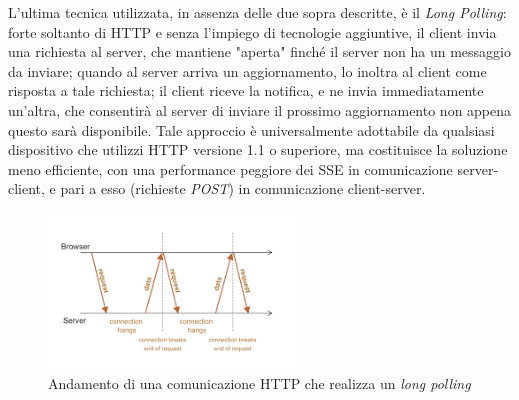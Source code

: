 L'ultima tecnica utilizzata, in assenza delle due sopra descritte, è il \emph{Long Polling}: forte soltanto di HTTP e senza l'impiego di tecnologie aggiuntive, il client invia una richiesta al server, che mantiene "aperta" finché il server non ha un messaggio da inviare; quando al server arriva un aggiornamento, lo inoltra al client come risposta a tale richiesta; il client riceve la notifica, e ne invia immediatamente un'altra, che consentirà al server di inviare il prossimo aggiornamento non appena questo sarà disponibile. Tale approccio è universalmente adottabile da qualsiasi dispositivo che utilizzi HTTP versione 1.1 o superiore, ma costituisce la soluzione meno efficiente, con una performance peggiore dei SSE in comunicazione server-client, e pari a esso (richieste \emph{POST}) in comunicazione client-server.
\begin{figure}[H]
    \centering
    \includegraphics[width=0.6\textwidth]{fig/long_polling.png}
    \caption[Diagramma Long Polling]{Andamento di una comunicazione HTTP che realizza un \emph{long polling}}
\end{figure}

